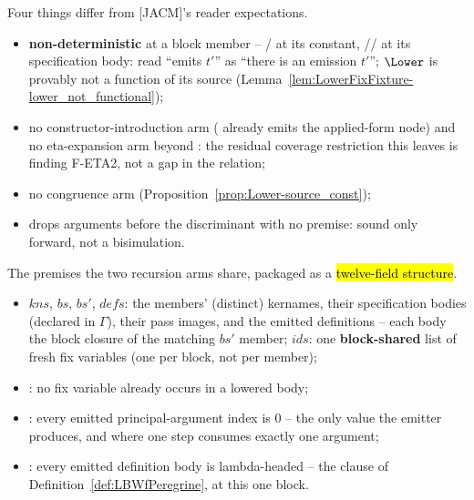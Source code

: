 \begin{remark}
 Four things differ from [JACM]'s reader expectations.
\begin{itemize}
\item \textbf{non-deterministic} at a block member -- / at its constant,
// at its specification body: read ``emits $t'$'' as ``there
is an emission $t'$''; $\Lower$ is provably not a function of its source
(Lemma~\ref{lem:LowerFixFixture-lower_not_functional});
\item no constructor-introduction arm ( already emits the applied-form node) and no
eta-expansion arm beyond : the residual coverage restriction this leaves is finding
F-ETA2, not a gap in the relation;
\item no  congruence arm (Proposition~\ref{prop:Lower-source_const});
\item {} drops arguments before the discriminant with no premise: sound only forward, not a
bisimulation.
\end{itemize}
\end{remark}

\begin{definition}
\label{def:LowerBlock}
\leanok
{}
 The premises the two recursion arms share, packaged as a \hl{twelve-field structure}.
\begin{itemize}
\item $kns$, $bs$, $bs'$, $defs$: the members' (distinct) kernames, their specification bodies (declared
in $\Gamma$), their pass images, and the emitted definitions -- each body the block closure of the
matching $bs'$ member; $ids$: one \textbf{block-shared} list of fresh fix variables (one per block, not
per member);
\item {}: no fix variable already occurs in a lowered body;
\item {}: every emitted principal-argument index is $0$ -- the only value the emitter
produces, and where one step consumes exactly one argument;
\item {}: every emitted definition body is lambda-headed -- the  clause of
Definition~\ref{def:LBWfPeregrine}, at this one block.
\end{itemize}
\end{definition}

